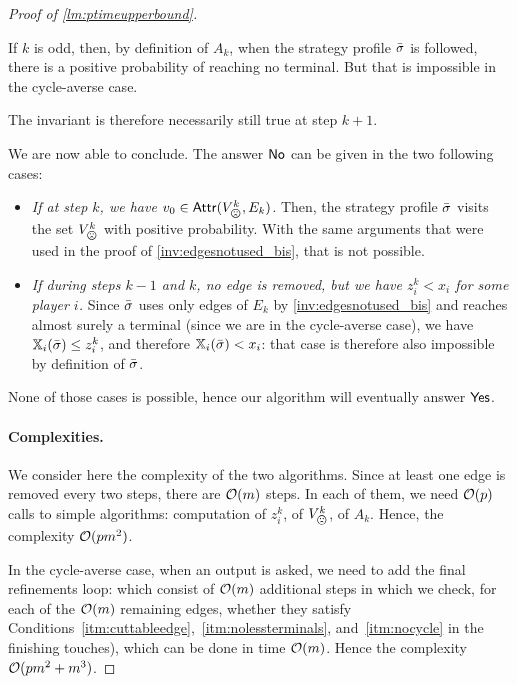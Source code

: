 \begin{proof}[Proof of \cref{lm:ptimeupperbound}]
\begin{claimproof}
\begin{claimproof}
        If $k$ is odd, then, by definition of $A_k$, when the strategy profile ${\bar{\sigma}}$ is followed, there is a positive probability of reaching no terminal.
        But that is impossible in the cycle-averse case.

        The invariant is therefore necessarily still true at step $k+1$.
\end{claimproof}

        

        We are now able to conclude.
        The answer $\mathsf{No}$ can be given in the two following cases:
            \begin{itemize}
                \item \emph{If at step $k$, we have $v_0 \in \Attr(V^k_\bad, E_k)$.}
                Then, the strategy profile ${\bar{\sigma}}$ visits the set $V^k_\bad$ with positive probability.
                With the same arguments that were used in the proof of \cref{inv:edgesnotused_bis}, that is not possible.
                
                \item \emph{If during steps $k-1$ and $k$, no edge is removed, but we have $z^k_i < x_i$ for some player $i$.}
                Since ${\bar{\sigma}}$ uses only edges of $E_k$ by \cref{inv:edgesnotused_bis} and reaches almost surely a terminal (since we are in the cycle-averse case), we have $\mathbb{X}_i({\bar{\sigma}}) \leq z^k_i$, and therefore $\mathbb{X}_i({\bar{\sigma}}) < x_i$: that case is therefore also impossible by definition of ${\bar{\sigma}}$.
            \end{itemize}
        None of those cases is possible, hence our algorithm will eventually answer $\mathsf{Yes}$.
    \end{claimproof}


\paragraph*{Complexities.}
We consider here the complexity of the two algorithms.
Since at least one edge is removed every two steps, there are $\mathcal{O}(m)$ steps.
In each of them, we need $\mathcal{O}(p)$ calls to simple algorithms: computation of $z_i^k$, of $V_\bad^k$, of $A_k$.
Hence, the complexity $\mathcal{O}(pm^2)$.

In the cycle-averse case, when an output is asked, we need to add the final refinements loop: which consist of $\mathcal{O}(m)$ additional steps in which we check, for each of the $\mathcal{O}(m)$ remaining edges, whether they satisfy Conditions~\ref{itm:cuttableedge},~\ref{itm:nolessterminals}, and~\ref{itm:nocycle} in the finishing touches), which can be done in time $\mathcal{O}(m)$.
Hence the complexity $\mathcal{O}(pm^2 + m^3)$.
\end{proof}





